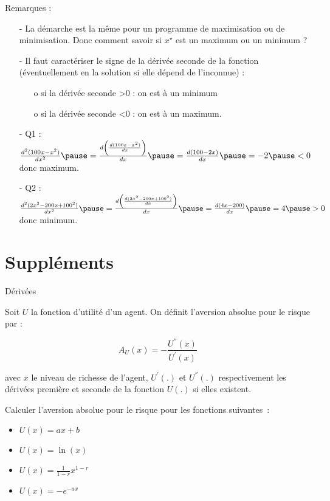 \documentclass[9pt,handout,professionalfonts,hyperref]{beamer}
\begin{document}
\begin{frame}

Remarques :
\begin{itemize}
\pause \item[-] La démarche est la même pour un programme de maximisation ou de minimisation. Donc comment savoir si $x^\star$ est un maximum ou un minimum ?\newline

\pause \item[-] Il faut caractériser le signe de la dérivée seconde de la fonction (éventuellement en la solution si elle dépend de l'inconnue) :

\begin{itemize}
\pause \item[o] si la dérivée seconde >0 : on est à un minimum
\pause \item[o] si la dérivée seconde <0 : on est à un maximum. \newline
\end{itemize}

\pause \item[-] Q1 : $\frac{d^2(100x-x^2)}{dx^2} \pause = \frac{d\left(\frac{d(100x-x^2)}{dx}\right)}{dx}\pause = \frac{d(100-2x)}{dx} \pause = -2\pause <0   $ \pause donc maximum. \newline

\pause \item[-] Q2 : $\frac{d^2(2x^2 -200x + 100^2)}{dx^2} \pause = \frac{d\left(\frac{d(2x^2 -200x + 100^2)}{dx}\right)}{dx}\pause = \frac{d(4x -200)}{dx} \pause = 4 \pause >0 $ \pause donc minimum.

\end{itemize}

\end{frame}

\section{Suppléments}

\begin{frame}{Dérivées}

Soit $U$ la fonction d'utilité d'un agent. On définit l'aversion absolue pour le risque par :

\[A_U(x) = -\frac{U^{''}(x)}{U^{'}(x)}\]

avec $x$ le niveau de richesse de l'agent, $U^{'}(.)$ et $U^{''}(.)$ respectivement les dérivées première et seconde de la fonction $U(.)$ si elles existent. \newline

Calculer l'aversion absolue pour le risque pour les fonctions suivantes~:
\begin{itemize}
	\item $U(x) = ax+b$
	\item $U(x) = \ln(x) $
	\item $U(x) = \frac{1}{1-r}x^{1-r}$
	\item $U(x) = -e^{-ax}$
\end{itemize}

\end{frame}
\end{document}
